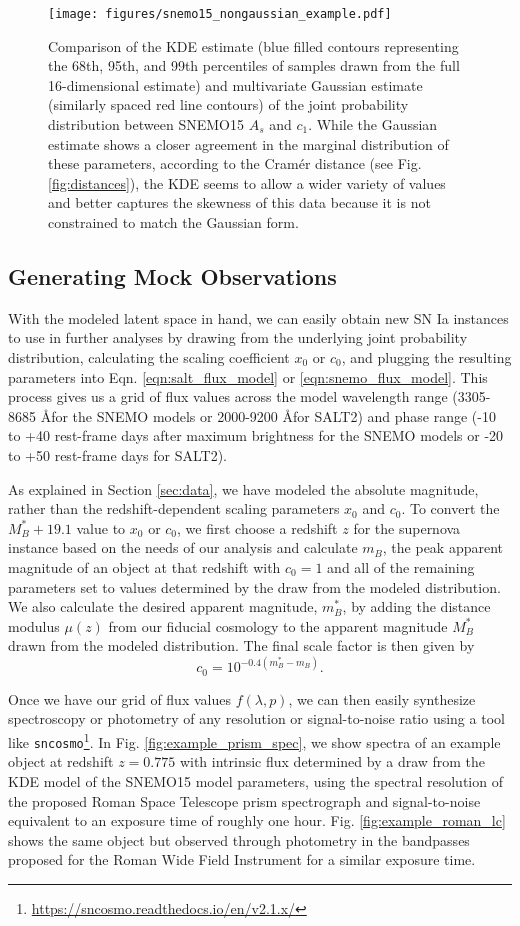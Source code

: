 \begin{figure}
    \centering
    \texttt{[image: figures/snemo15\_nongaussian\_example.pdf]}
    \caption{Comparison of the KDE estimate (blue filled contours representing the 68th, 95th, and 99th percentiles of samples drawn from the full 16-dimensional estimate) and multivariate Gaussian estimate (similarly spaced red line contours) of the joint probability distribution between SNEMO15 $A_s$ and $c_1$. While the Gaussian estimate shows a closer agreement in the marginal distribution of these parameters, according to the Cram\'{e}r distance (see Fig. \ref{fig:distances}), the KDE seems to allow a wider variety of values and better captures the skewness of this data because it is not constrained to match the Gaussian form.}
    \label{fig:snemo15_joint_example}
\end{figure}

\subsection{Generating Mock Observations}
With the modeled latent space in hand, we can easily obtain new SN Ia instances to use in further analyses by drawing from the underlying joint probability distribution, calculating the scaling coefficient $x_0$ or $c_0$, and plugging the resulting parameters into Eqn. \ref{eqn:salt_flux_model} or \ref{eqn:snemo_flux_model}. This process gives us a grid of flux values across the model wavelength range (3305-8685 \AA for the SNEMO models or 2000-9200 \AA for SALT2) and phase range (-10 to +40 rest-frame days after maximum brightness for the SNEMO models or -20 to +50 rest-frame days for SALT2).

As explained in Section \ref{sec:data}, we have modeled the absolute magnitude, rather than the redshift-dependent scaling parameters $x_0$ and $c_0$. To convert the $M_B^* + 19.1$ value to $x_0$ or $c_0$, we first choose a redshift $z$ for the supernova instance based on the needs of our analysis and calculate $m_B$, the peak apparent magnitude of an object at that redshift with $c_0=1$ and all of the remaining parameters set to values determined by the draw from the modeled distribution. We also calculate the desired apparent magnitude, $m_B^*$, by adding the distance modulus $\mu(z)$ from our fiducial cosmology to the apparent magnitude $M_B^*$ drawn from the modeled distribution. The final scale factor is then given by 
$$c_0 = 10^{-0.4(m_B^*-m_B)}.$$

Once we have our grid of flux values $f(\lambda, p)$, we can then easily synthesize spectroscopy or photometry of any resolution or signal-to-noise ratio using a tool like \verb|sncosmo|\footnote{\url{https://sncosmo.readthedocs.io/en/v2.1.x/}}. In Fig. \ref{fig:example_prism_spec}, we show spectra of an example object at redshift $z=0.775$ with intrinsic flux determined by a draw from the KDE model of the SNEMO15 model parameters, using the spectral resolution of the proposed Roman Space Telescope prism spectrograph and signal-to-noise equivalent to an exposure time of roughly one hour. Fig. \ref{fig:example_roman_lc} shows the same object but observed through photometry in the bandpasses proposed for the Roman Wide Field Instrument for a similar exposure time. 

